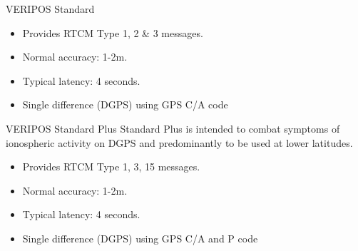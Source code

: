 \documentclass[12pt]{beamer}
\begin{document}
\begin{frame}{VERIPOS Standard}
	
	\begin{itemize}	
	\item Provides RTCM Type 1, 2 \& 3 messages.
	\item Normal accuracy: 1-2m. 
	\item Typical latency: 4 seconds.
	\item Single difference (DGPS) using GPS C/A code
	\end{itemize}	
	
\end{frame}

\begin{frame}{VERIPOS Standard Plus}
	Standard Plus is intended to combat symptoms of ionospheric activity on DGPS and predominantly to be used at lower latitudes. 
	\begin{itemize}	
		\item Provides RTCM Type 1, 3, 15 messages.
		\item Normal accuracy: 1-2m. 
		\item Typical latency: 4 seconds.
		\item Single difference (DGPS) using GPS C/A and P code
	\end{itemize}	
\end{frame}	
\end{document}
